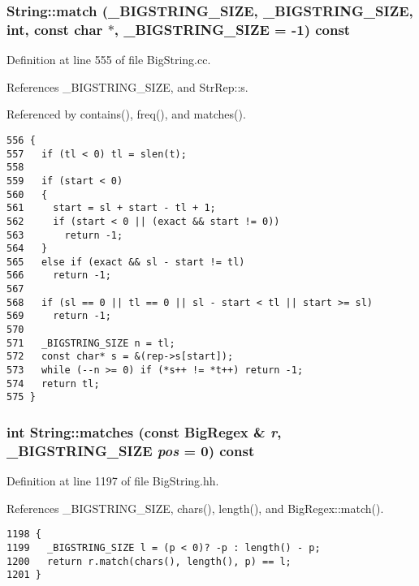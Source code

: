 \subsubsection{ String::match ({\bf \_\-BIGSTRING\_\-SIZE}, {\bf \_\-BIGSTRING\_\-SIZE}, int, const char $\ast$, {\bf \_\-BIGSTRING\_\-SIZE} = -1) const\hspace{0.3cm}{\tt  [protected]}}\label{classString_b2}




Definition at line 555 of file Big\-String.cc.

References \_\-BIGSTRING\_\-SIZE, and Str\-Rep::s.

Referenced by contains(), freq(), and matches().



\footnotesize\begin{verbatim}556 {
557   if (tl < 0) tl = slen(t);
558 
559   if (start < 0)
560   {
561     start = sl + start - tl + 1;
562     if (start < 0 || (exact && start != 0))
563       return -1;
564   }
565   else if (exact && sl - start != tl)
566     return -1;
567 
568   if (sl == 0 || tl == 0 || sl - start < tl || start >= sl)
569     return -1;
570 
571   _BIGSTRING_SIZE n = tl;
572   const char* s = &(rep->s[start]);
573   while (--n >= 0) if (*s++ != *t++) return -1;
574   return tl;
575 }
\end{verbatim}\normalsize 
{}
\subsubsection{\setlength{\rightskip}{0pt plus 5cm}int String::matches (const {\bf Big\-Regex} \& {\em r}, {\bf \_\-BIGSTRING\_\-SIZE} {\em pos} = 0) const\hspace{0.3cm}{\tt  [inline]}}\label{classString_a46}




Definition at line 1197 of file Big\-String.hh.

References \_\-BIGSTRING\_\-SIZE, chars(), length(), and Big\-Regex::match().



\footnotesize\begin{verbatim}1198 {
1199   _BIGSTRING_SIZE l = (p < 0)? -p : length() - p;
1200   return r.match(chars(), length(), p) == l;
1201 }
\end{verbatim}\normalsize 
{}

